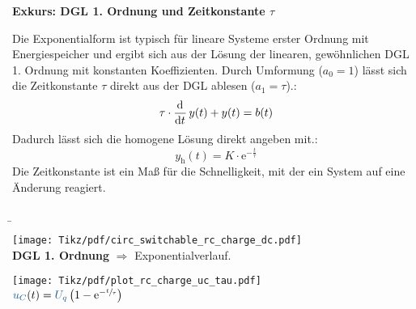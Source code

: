 \begin{frame}[t]
{    \textbf{Exkurs: DGL 1. Ordnung und Zeitkonstante $\tau$}

    Die Exponentialform ist typisch für lineare Systeme erster Ordnung mit Energiespeicher
    und ergibt sich aus der Lösung der linearen, gewöhnlichen DGL 1. Ordnung mit konstanten Koeffizienten.
    Durch Umformung ($a_0=1$) lässt sich die Zeitkonstante $\tau$ direkt aus der DGL ablesen ($a_1=\tau$).:
    \begin{equation}\label{eq:dgl:tau}
        \tau \cdot \frac{\mathrm{d}^{{}}}{\mathrm{d}t^{{}}}\,y(t) + y(t) = b(t)
    \end{equation}
    Dadurch lässt sich die homogene Lösung direkt angeben mit.:
    \begin{equation}
        y_{\mathrm{h}}(t) = K\cdot\mathrm{e}^{-\frac{t}{\tau}}
    \end{equation}
    Die Zeitkonstante ist ein Maß für die Schnelligkeit, mit der ein System auf eine Änderung reagiert.
    }%
\b{%
\begin{minipage}{\textwidth}\centering%
\begin{minipage}[t][][t]{0.48\textwidth}\centering\vspace{0cm}%
    \texttt{[image: Tikz/pdf/circ\_switchable\_rc\_charge\_dc.pdf]}\\[4pt]
    \textbf{DGL 1. Ordnung} $\Rightarrow$ Exponentialverlauf.
\end{minipage}%
\pause%
\begin{minipage}[t][][t]{0.48\textwidth}\centering\vspace{0cm}%
    \texttt{[image: Tikz/pdf/plot\_rc\_charge\_uc\_tau.pdf]}\\
    $\ecv{u_C}(t) = \ecv{U_q} \left( 1 - \mathrm{e}^{-\sfrac{t}{\tau}} \right)$
\end{minipage}%
\pause%
\vspace{1cm}%


\end{minipage}}
\end{frame}
